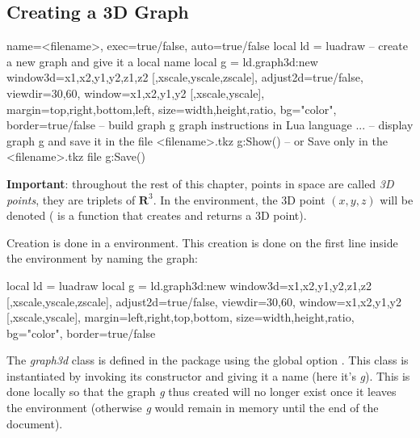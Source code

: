 \subsection{Creating a 3D Graph}

\begin{TeXcode}
\begin{luadraw}{ name=<filename>, exec=true/false, auto=true/false }
local ld = luadraw
-- create a new graph and give it a local name
local g = ld.graph3d:new{ window3d={x1,x2,y1,y2,z1,z2 [,xscale,yscale,zscale]}, adjust2d=true/false, viewdir={30,60}, window={x1,x2,y1,y2 [,xscale,yscale]}, margin={top,right,bottom,left}, size={width,height,ratio}, bg="color", border=true/false }
-- build graph g
graph instructions in Lua language ...
-- display graph g and save it in the file <filename>.tkz
g:Show()
-- or Save only in the <filename>.tkz file
g:Save()
\end{luadraw}
\end{TeXcode}

\noindent\textbf{Important}: throughout the rest of this chapter, points in space are called \emph{3D points}, they are triplets of $\mathbf R^3$. In the \luadrawenv environment, the 3D point $(x,y,z)$ will be denoted  ( is a function that creates and returns a 3D point).

Creation is done in a \luadrawenv environment. This creation is done on the first line inside the environment by naming the graph:

\begin{Luacode}
local ld = luadraw
local g = ld.graph3d:new{ window3d={x1,x2,y1,y2,z1,z2 [,xscale,yscale,zscale]}, adjust2d=true/false, viewdir={30,60}, window={x1,x2,y1,y2 [,xscale,yscale]}, margin={left,right,top,bottom}, size={width,height,ratio}, bg="color", border=true/false }
\end{Luacode}

The \emph{graph3d} class is defined in the \luadrawenv package using the global option . This class is instantiated by invoking its constructor and giving it a name (here it's \emph{g}). This is done locally so that the graph \emph{g} thus created will no longer exist once it leaves the environment (otherwise \emph{g} would remain in memory until the end of the document).

